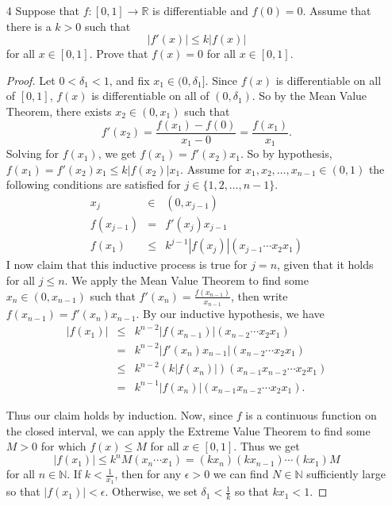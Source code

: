 \documentclass[reqno]{article}
\theoremstyle{remark}
\numberwithin{equation}{section}
\newcommand{\N}{\mathbb{N}}
\newcommand{\R}{\mathbb{R}}
\begin{document}
\begin{enumerate}

\item[4] Suppose that $f: [0,1] \to \R$ is differentiable and $f(0) = 0$. Assume that there is a
$k > 0$ such that $$|f'(x)| \leq k|f(x)|$$ for all 
$x\in [0,1]$. Prove that $f(x) = 0$ for all $x\in [0,1]$.

\begin{proof}

    Let $0<\delta_1<1$, and fix $x_1 \in (0, \delta_1]$. Since $f(x)$ is differentiable on all of $[0,1]$, $f(x)$ is differentiable on all of $(0, \delta_1)$. So by the Mean 
    Value Theorem, there exists $x_2 \in (0, x_1)$ such that $$ f'(x_2) = \frac{f(x_1) - f(0)}{x_1-0} = \frac{f(x_1)}{x_1} .$$ Solving for $f(x_1)$, we get 
    $f(x_1) = f'(x_2)x_1$. So by hypothesis, $f(x_1) = f'(x_2) x_1 \leq k|f(x_2)|x_1$. Assume for $x_1, x_2, \ldots, x_{n-1} \in (0,1)$ the following conditions are satisfied for $j\in\{1,2,\ldots, n-1\}$. 
    \begin{eqnarray*}
    x_j &\in& (0,x_{j-1}) \\
    f(x_{j-1}) &=& f'(x_j)x_{j-1} \\
    f(x_1) &\leq& k^{j-1}|f(x_j)|(x_{j-1} \cdots x_2x_1)
    \end{eqnarray*}
    I now claim that this inductive process is true for $j=n$, given that it holds for all $j \leq n$. 
    We apply the Mean Value Theorem to find some $x_n \in (0, x_{n-1})$ such that $f'(x_n) = \frac{f(x_{n-1})}{x_{n-1}}$, then write $f(x_{n-1}) = f'(x_n)x_{n-1}.$ By our inductive hypothesis, we have 
    \begin{eqnarray*}
    |f(x_1)| &\leq& k^{n-2}|f(x_{n-1})|(x_{n-2}\cdots x_2x_1) \\
    &=& k^{n-2}|f'(x_n)x_{n-1}|(x_{n-2}\cdots x_2x_1)  \\
    &\leq& k^{n-2}(k|f(x_n)|)(x_{n-1}x_{n-2}\cdots x_2x_1) \\
    &=& k^{n-1}|f(x_n)|(x_{n-1}x_{n-2}\cdots x_2x_1).
    \end{eqnarray*}
    
    Thus our claim holds by induction. Now, since $f$ is a continuous function on the closed interval, we can apply the Extreme Value Theorem to find some $M>0$ for which $f(x) \leq M$ for all $x\in [0,1]$. Thus we get 
    $$|f(x_1)| \leq k^n M (x_n \cdots x_1)
    =(kx_n)(kx_{n-1})\cdots(kx_1)M
    $$ for all $n \in \N$. If $k < \frac{1}{x_1}$, then for any $\epsilon > 0$ we can find $N\in \N$ sufficiently large so that 
    $|f(x_1)| < \epsilon$. Otherwise, we set $\delta_1< \frac{1}{k}$ so that $kx_1< 1$.

\end{proof}

\end{enumerate}
\end{document}
